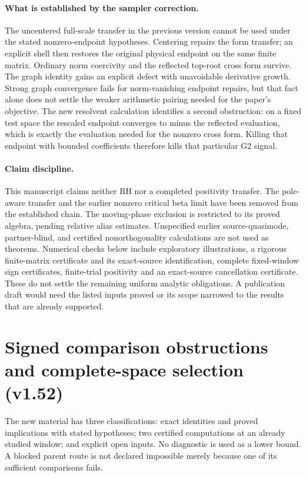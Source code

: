 \documentclass[11pt]{article}
\theoremstyle{remark}
\begin{document}
\paragraph{What is established by the sampler correction.}
The uncentered full-scale transfer in the previous version cannot be used
under the stated nonzero-endpoint hypotheses. Centering repairs the form
transfer; an explicit shell then restores the original physical endpoint
on the same finite matrix. Ordinary norm coercivity and the reflected
top-root cross form survive. The graph identity gains an explicit defect
with unavoidable derivative growth. Strong graph convergence fails for
norm-vanishing endpoint repairs, but that fact alone does not settle the
weaker arithmetic pairing needed for the paper's objective. The new
resolvent calculation identifies a second obstruction: on a fixed test
space the rescaled endpoint converges to minus the reflected evaluation,
which is exactly the evaluation needed for the nonzero cross form.
Killing that endpoint with bounded coefficients therefore kills that
particular G2 signal.

\paragraph{Claim discipline.}
This manuscript claims neither RH nor a completed positivity transfer.
The pole-aware transfer and the earlier nonzero critical beta limit have
been removed from the established chain. The moving-phase exclusion is
restricted to its proved algebra, pending relative alias estimates.
Unspecified earlier source-quasimode, partner-blind, and certified
nonorthogonality calculations are not used as theorems. Numerical checks
below include exploratory illustrations, a rigorous finite-matrix
certificate and its exact-source identification, complete fixed-window
sign certificates, finite-trial positivity and an exact-source
cancellation certificate. These do not settle the remaining uniform
analytic obligations. A publication draft would need the listed inputs
proved or its scope narrowed to the results that are already supported.

\section{Signed comparison obstructions and complete-space selection (v1.52)}
\label{sec:v152-route-selection}
The new material has three classifications: exact identities and proved
implications with stated hypotheses; two certified computations at an
already studied window; and explicit open inputs. No diagnostic is used
as a lower bound. A blocked parent route is not declared impossible
merely because one of its sufficient comparisons fails.
\end{document}

